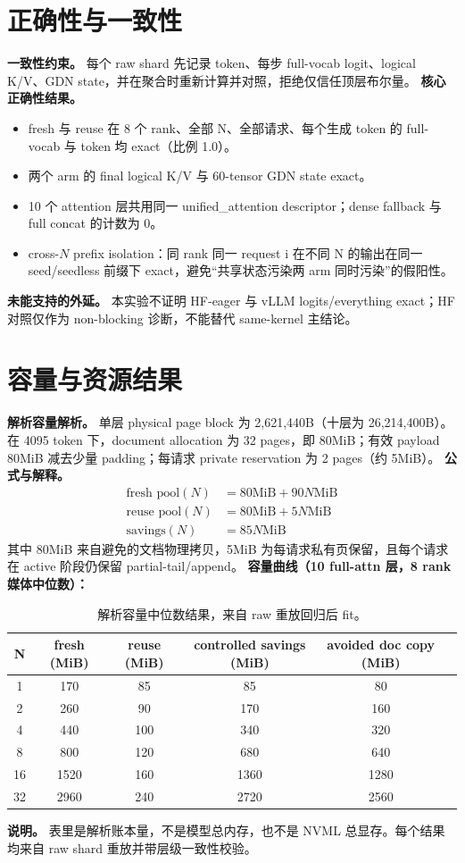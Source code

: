 \documentclass[11pt]{article}
\begin{document}
\section{正确性与一致性}
\textbf{一致性约束。} 每个 raw shard 先记录 token、每步 full-vocab logit、logical K/V、GDN state，并在聚合时重新计算并对照，拒绝仅信任顶层布尔量。
\textbf{核心正确性结果。}
\begin{itemize}
  \item fresh 与 reuse 在 8 个 rank、全部 N、全部请求、每个生成 token 的 full-vocab 与 token 均 exact（比例 1.0）。  
  \item 两个 arm 的 final logical K/V 与 60-tensor GDN state exact。  
  \item 10 个 attention 层共用同一 unified\_attention descriptor；dense fallback 与 full concat 的计数为 0。  
  \item cross-$N$ prefix isolation：同 rank 同一 request i 在不同 N 的输出在同一 seed/seedless 前缀下 exact，避免“共享状态污染两 arm 同时污染”的假阳性。  
\end{itemize}
\textbf{未能支持的外延。} 本实验不证明 HF-eager 与 vLLM logits/everything exact；HF 对照仅作为 non-blocking 诊断，不能替代 same-kernel 主结论。

\section{容量与资源结果}
\textbf{解析容量解析。} 单层 physical page block 为 2,621,440B（十层为 26,214,400B）。在 4095 token 下，document allocation 为 32 pages，即 80MiB；有效 payload 80MiB 减去少量 padding；每请求 private reservation 为 2 pages（约 5MiB）。  
\textbf{公式与解释。}
\begin{align}
\text{fresh pool}(N) &= 80\mathrm{MiB} + 90N\mathrm{MiB}\\
\text{reuse pool}(N) &= 80\mathrm{MiB} + 5N\mathrm{MiB}\\
\text{savings}(N) &= 85N\mathrm{MiB}
\end{align}
其中 80MiB 来自避免的文档物理拷贝，5MiB 为每请求私有页保留，且每个请求在 active 阶段仍保留 partial-tail/append。  
\textbf{容量曲线（10 full-attn 层，8 rank 媒体中位数）：}
\begin{table}[h]
\centering
\begin{tabular}{cccccc}
\toprule
N & fresh (MiB) & reuse (MiB) & controlled savings (MiB) & avoided doc copy (MiB)\\
\midrule
1 & 170 & 85 & 85 & 80\\
2 & 260 & 90 & 170 & 160\\
4 & 440 & 100 & 340 & 320\\
8 & 800 & 120 & 680 & 640\\
16 & 1520 & 160 & 1360 & 1280\\
32 & 2960 & 240 & 2720 & 2560\\
\bottomrule
\end{tabular}
\caption{解析容量中位数结果，来自 raw 重放回归后 fit。}
\end{table}
\textbf{说明。} 表里是解析账本量，不是模型总内存，也不是 NVML 总显存。每个结果均来自 raw shard 重放并带层级一致性校验。
\end{document}

